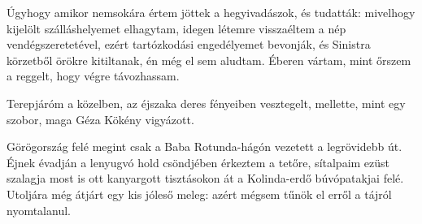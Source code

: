 \documentclass{IEEEtran}
\begin{document}
Úgyhogy amikor nemsokára értem jöttek a hegyivadászok, és tudatták: mivelhogy
kijelölt szálláshelyemet elhagytam, idegen létemre visszaéltem a nép
vendégszeretetével, ezért tartózkodási engedélyemet bevonják, és Sinistra
körzetből örökre kitiltanak, én még el sem aludtam. Éberen vártam, mint őrszem
a reggelt, hogy végre távozhassam.

Terepjáróm a közelben, az éjszaka deres fényeiben vesztegelt, mellette, mint
egy szobor, maga Géza Kökény vigyázott.

Görögország felé megint csak a Baba Rotunda-hágón vezetett a legrövidebb út.
Éjnek évadján a lenyugvó hold csöndjében érkeztem a tetőre, sítalpaim ezüst
szalagja most is ott kanyargott tisztásokon át a Kolinda-erdő búvópatakjai
felé. Utoljára még átjárt egy kis jóleső meleg: azért mégsem tűnök el erről a
tájról nyomtalanul.  
\end{document}

